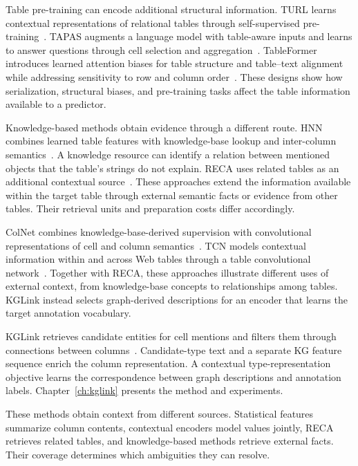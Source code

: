 Table pre-training can encode additional structural information. TURL learns contextual representations of relational tables through self-supervised pre-training~\cite{lit-deng2022turl}. TAPAS augments a language model with table-aware inputs and learns to answer questions through cell selection and aggregation~\cite{lit-herzig2020tapas}. TableFormer introduces learned attention biases for table structure and table--text alignment while addressing sensitivity to row and column order~\cite{lit-yang2022tableformer}. These designs show how serialization, structural biases, and pre-training tasks affect the table information available to a predictor.

Knowledge-based methods obtain evidence through a different route. HNN combines learned table features with knowledge-base lookup and inter-column semantics~\cite{bg-hnn}. A knowledge resource can identify a relation between mentioned objects that the table's strings do not explain. RECA uses related tables as an additional contextual source~\cite{bg-reca}. These approaches extend the information available within the target table through external semantic facts or evidence from other tables. Their retrieval units and preparation costs differ accordingly.

ColNet combines knowledge-base-derived supervision with convolutional representations of cell and column semantics~\cite{lit-chen2019colnet}. TCN models contextual information within and across Web tables through a table convolutional network~\cite{lit-wang2021tcn}. Together with RECA, these approaches illustrate different uses of external context, from knowledge-base concepts to relationships among tables. KGLink instead selects graph-derived descriptions for an encoder that learns the target annotation vocabulary.

KGLink retrieves candidate entities for cell mentions and filters them through connections between columns~\cite{bg-kglink}. Candidate-type text and a separate KG feature sequence enrich the column representation. A contextual type-representation objective learns the correspondence between graph descriptions and annotation labels. Chapter~\ref{ch:kglink} presents the method and experiments.

These methods obtain context from different sources. Statistical features summarize column contents, contextual encoders model values jointly, RECA retrieves related tables, and knowledge-based methods retrieve external facts. Their coverage determines which ambiguities they can resolve.

